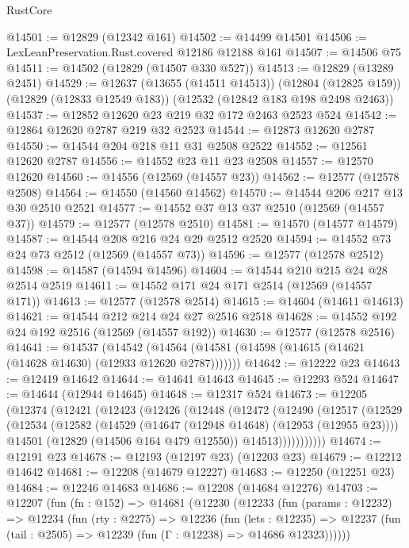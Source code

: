 \begin{lexlean}{RustCore}
\begin{coremodule}
@14501 := @12829 (@12342 @161)
@14502 := @14499 @14501
@14506 := LexLeanPreservation.Rust.covered @12186 @12188 @161
@14507 := @14506 @75
@14511 := @14502 (@12829 (@14507 @330 @527))
@14513 := @12829 (@13289 @2451)
@14529 := @12637
    (@13655 (@14511 @14513))
    (@12804 (@12825 @159))
    (@12829 (@12833 @12549 @183))
    (@12532 (@12842 @183 @198 @2498 @2463))
@14537 := @12852 @12620 @23 @219 @32 @172 @2463 @2523 @524
@14542 := @12864 @12620 @2787 @219 @32 @2523
@14544 := @12873 @12620 @2787
@14550 := @14544 @204 @218 @11 @31 @2508 @2522
@14552 := @12561 @12620 @2787
@14556 := @14552 @23 @11 @23 @2508
@14557 := @12570 @12620
@14560 := @14556 (@12569 (@14557 @23))
@14562 := @12577 (@12578 @2508)
@14564 := @14550 (@14560 @14562)
@14570 := @14544 @206 @217 @13 @30 @2510 @2521
@14577 := @14552 @37 @13 @37 @2510 (@12569 (@14557 @37))
@14579 := @12577 (@12578 @2510)
@14581 := @14570 (@14577 @14579)
@14587 := @14544 @208 @216 @24 @29 @2512 @2520
@14594 := @14552 @73 @24 @73 @2512 (@12569 (@14557 @73))
@14596 := @12577 (@12578 @2512)
@14598 := @14587 (@14594 @14596)
@14604 := @14544 @210 @215 @24 @28 @2514 @2519
@14611 := @14552 @171 @24 @171 @2514 (@12569 (@14557 @171))
@14613 := @12577 (@12578 @2514)
@14615 := @14604 (@14611 @14613)
@14621 := @14544 @212 @214 @24 @27 @2516 @2518
@14628 := @14552 @192 @24 @192 @2516 (@12569 (@14557 @192))
@14630 := @12577 (@12578 @2516)
@14641 := @14537
    (@14542 (@14564 (@14581 (@14598 (@14615 (@14621 (@14628 @14630) (@12933 @12620 @2787)))))))
@14642 := @12222 @23
@14643 := @12419 @14642
@14644 := @14641 @14643
@14645 := @12293 @524
@14647 := @14644 (@12944 @14645)
@14648 := @12317 @524
@14673 := @12205
    (@12374
      (@12421
        (@12423
          (@12426
            (@12448
              (@12472
                (@12490
                  (@12517
                    (@12529
                      (@12534
                        (@12582
                          (@14529 (@14647 (@12948 @14648) (@12953 (@12955 @23))))
                          @14501
                          (@12829 (@14506 @164 @479 @12550))
                          @14513)))))))))))
@14674 := @12191 @23
@14678 := @12193 (@12197 @23) (@12203 @23)
@14679 := @12212 @14642
@14681 := @12208 (@14679 @12227)
@14683 := @12250 (@12251 @23)
@14684 := @12246 @14683
@14686 := @12208 (@14684 @12276)
@14703 := @12207
    (fun (fn : @152) =>
    @14681
      (@12230
        (@12233
          (fun (params : @12232) =>
          @12234
            (fun (rty : @2275) =>
            @12236
              (fun (lets : @12235) =>
              @12237 (fun (tail : @2505) => @12239 (fun (Γ : @12238) => @14686 @12323))))))

\end{coremodule}
\end{lexlean}
